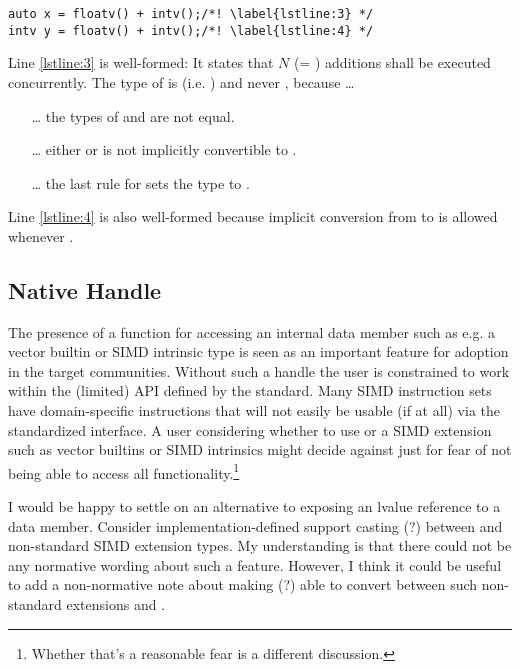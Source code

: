 \begin{enumerate}
\begin{lstlisting}[style=Vc]
auto x = floatv() + intv();/*! \label{lstline:3} */
intv y = floatv() + intv();/*! \label{lstline:4} */
\end{lstlisting}
    Line \ref{lstline:3} is well-formed:
    It states that $N$ (= ) additions shall be executed concurrently.
    The type of  is  (i.e. ) and never \datapar[<\float{}>], because \ldots
    \begin{enumerate}
      \item[\ldots] the  types of  and  are not equal.
      \item[\ldots] either  or  is not implicitly convertible to \datapar[<\float{}>].
      \item[\ldots] the last rule for  sets the  type to .
    \end{enumerate}
    Line \ref{lstline:4} is also well-formed because implicit conversion from  to  is allowed whenever .
\end{enumerate}


\subsection{Native Handle}\label{sec:native}
The presence of a  function for accessing an internal data member such as e.g. a vector builtin or SIMD intrinsic type is seen as an important feature for adoption in the target communities.
Without such a handle the user is constrained to work within the (limited) API defined by the standard.
Many SIMD instruction sets have domain-specific instructions that will not easily be usable (if at all) via the standardized interface.
A user considering whether to use \datapar or a SIMD extension such as vector builtins or SIMD intrinsics might decide against \datapar just for fear of not being able to access all functionality.\footnote{
  Whether that's a reasonable fear is a different discussion.
}

I would be happy to settle on an alternative to exposing an lvalue reference to a data member.
Consider implementation-defined support casting (?) between \datapar and non-standard SIMD extension types.
My understanding is that there could not be any normative wording about such a feature.
However, I think it could be useful to add a non-normative note about making (?) able to convert between such non-standard extensions and \datapar.

